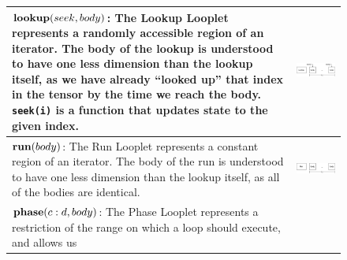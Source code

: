 \begin{figure}[ht]
\footnotesize
\begin{tabular} {|l|c|} 
\hline
    \begin{minipage}[c]{0.65\linewidth}
        $\text{\textbf{lookup}}(seek, body)$: The Lookup Looplet represents a
        randomly accessible region of an iterator. The body of the lookup is
        understood to have one less dimension than the lookup itself, as we have
        already ``looked up'' that index in the tensor by the time we reach the
        body. \texttt{seek(i)} is a function that updates state to the given
        index.
    \end{minipage} &
    \begin{minipage}[c]{0.35\linewidth}
        \centering
        \includegraphics[scale=0.20]{Looplets-lookup.png}
    \end{minipage} \\ \hline
    \begin{minipage}[c]{0.65\linewidth}
        $\text{\textbf{run}}(body)$: The Run Looplet represents a constant
        region of an iterator. The body of the run is understood to have one
        less dimension than the lookup itself, as all of the bodies are
        identical.
    \end{minipage} &
    \begin{minipage}[c]{0.35\linewidth}
        \centering
        \includegraphics[scale=0.20]{Looplets-run.png}
    \end{minipage} \\ \hline
    \begin{minipage}[c]{0.65\linewidth}
        $\text{\textbf{phase}}(c:d, body)$: The Phase Looplet represents a
        restriction of the range on which a loop should execute, and allows us

\end{minipage}
\end{tabular}
\end{figure}
